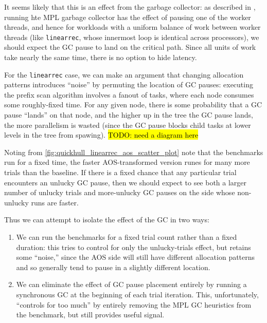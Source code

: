 \documentclass[leqno,11pt]{article}
\begin{document}
It seems likely that this is an effect from the garbage collector: as described
in \citet{mpl-orig}, running hte MPL garbage collector has the effect of pausing
one of the worker threads, and hence for workloads with a uniform balance of
work between worker threads (like \texttt{linearrec}, whose innermost loop is
identical across processors), we should expect the GC pause to land on the
critical path. Since all units of work take nearly the same time, there is no
option to hide latency.

For the \texttt{linearrec} case, we can make an argument that changing
allocation patterns introduces ``noise'' by permuting the location of GC pauses:
executing the prefix scan algorithm involves a fanout of tasks, where each node
consumes some roughly-fixed time. For any given node, there is some probability
that a GC pause ``lands'' on that node, and the higher up in the tree the GC
pause lands, the more parallelism is wasted (since the GC pause blocks child
tasks at lower levels in the tree from spawing). \hl{TODO: need a diagram here}

Noting from \cref{fig:quickhull_linearrec_aos_scatter_plot} note that the
benchmarks run for a fixed time, the faster AOS-transformed version runes for
many more trials than the baseline. If there is a fixed chance that any
particular trial encounters an unlucky GC pause, then we should expect to see
both a larger number of unlucky trials and more-unlucky GC pauses on the side
whose non-unlucky runs are faster.

Thus we can attempt to isolate the effect of the GC in two ways:
\begin{enumerate}
\item We can run the benchmarks for a fixed trial count rather than a fixed
  duration: this tries to control for only the unlucky-trials effect, but
  retains some ``noise,'' since the AOS side will still have different
  allocation patterns and so generally tend to pause in a slightly different
  location.

\item We can eliminate the effect of GC pause placement entirely by running a
  synchronous GC at the beginning of each trial iteration. This, unfortunately,
  ``controls for too much'' by entirely removing the MPL GC heuristics from the
  benchmark, but still provides useful signal.
\end{enumerate}
\end{document}
